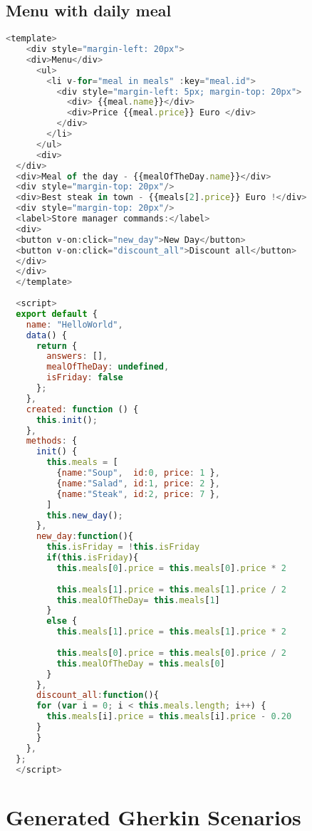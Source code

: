 \subsection{Menu with daily meal}
\label{appendix:daily_menu_source_code}
\begin{lstlisting}[language=JavaScript]
<template>
    <div style="margin-left: 20px">
    <div>Menu</div>
      <ul>
        <li v-for="meal in meals" :key="meal.id">
          <div style="margin-left: 5px; margin-top: 20px">
            <div> {{meal.name}}</div> 
            <div>Price {{meal.price}} Euro </div>
          </div>
        </li>
      </ul>
      <div>
  </div>
  <div>Meal of the day - {{mealOfTheDay.name}}</div>
  <div style="margin-top: 20px"/>
  <div>Best steak in town - {{meals[2].price}} Euro !</div>
  <div style="margin-top: 20px"/>
  <label>Store manager commands:</label>
  <div>
  <button v-on:click="new_day">New Day</button>
  <button v-on:click="discount_all">Discount all</button>
  </div>
  </div>
  </template>
  
  <script>
  export default {
    name: "HelloWorld",
    data() {
      return {
        answers: [],
        mealOfTheDay: undefined,
        isFriday: false
      };
    },
    created: function () {
      this.init();
    },
    methods: {
      init() {
        this.meals = [
          {name:"Soup",  id:0, price: 1 },
          {name:"Salad", id:1, price: 2 },
          {name:"Steak", id:2, price: 7 },
        ]
        this.new_day();
      },
      new_day:function(){
        this.isFriday = !this.isFriday
        if(this.isFriday){
          this.meals[0].price = this.meals[0].price * 2
  
          this.meals[1].price = this.meals[1].price / 2
          this.mealOfTheDay= this.meals[1]
        }
        else {
          this.meals[1].price = this.meals[1].price * 2
  
          this.meals[0].price = this.meals[0].price / 2
          this.mealOfTheDay = this.meals[0]
        }
      },
      discount_all:function(){
      for (var i = 0; i < this.meals.length; i++) {
        this.meals[i].price = this.meals[i].price - 0.20 
      } 
      }
    },
  };
  </script>
\end{lstlisting}

\section{Generated Gherkin Scenarios}
